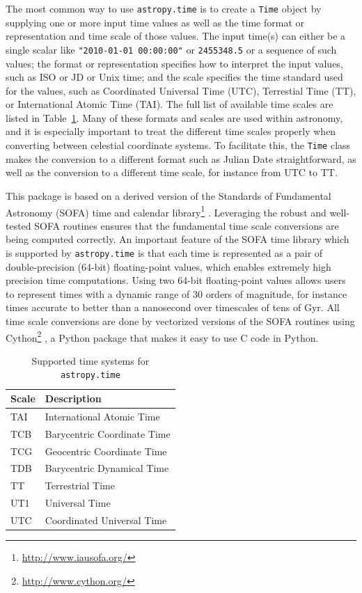 \documentclass[traditabstract]{aa}
\begin{document}
The most common way to use \texttt{astropy.time} is to create a \texttt{Time}
object by supplying one or more input time values as well as the time
format or representation and time scale of those values. The input time(s) can
either be a single scalar like \verb|"2010-01-01 00:00:00"| or \verb|2455348.5|
or a sequence of such values; the format or representation specifies how to
interpret the input values, such as ISO or JD or Unix time; and the scale
specifies the time standard used for the values, such as Coordinated Universal
Time (UTC), Terrestial Time (TT), or International Atomic Time (TAI). The full
list of available time scales are listed in Table~\ref{tab:time_systems}. Many
of these formats and scales are used within astronomy, and it is especially
important to treat the different time scales properly when converting between
celestial coordinate systems. To facilitate this, the \texttt{Time} class makes
the conversion to a different format such as Julian Date straightforward, as
well as the conversion to a different time scale, for instance from UTC to TT.

This package is based on a derived version of the Standards of Fundamental
Astronomy (SOFA) time and calendar
library\footnote{\url{http://www.iausofa.org/}} \citep{sofa_wallace}.
Leveraging the robust and well-tested SOFA routines ensures that the
fundamental time scale conversions are being computed correctly. An important
feature of the SOFA time library which is supported by \texttt{astropy.time} is
that each time is represented as a pair of double-precision (64-bit)
floating-point values, which enables extremely high precision time
computations. Using two 64-bit floating-point values allows users to represent
times with a dynamic range of 30 orders of magnitude, for instance times
accurate to better than a nanosecond over timescales of tens of Gyr. All time
scale conversions are done by vectorized versions of the SOFA routines using
Cython\footnote{\url{http://www.cython.org/}} \citep{cython}, a Python package
that makes it easy to use C code in Python.

\begin{table}
\caption{Supported time systems for \texttt{astropy.time}\label{tab:time_systems}}
\center
\begin{tabular}{ll}
\hline
Scale  & Description \\
\hline
TAI    & International Atomic Time \\
TCB    & Barycentric Coordinate Time \\
TCG    & Geocentric Coordinate Time \\
TDB    & Barycentric Dynamical Time \\
TT     & Terrestrial Time \\
UT1    & Universal Time \\
UTC    & Coordinated Universal Time \\
\hline
\end{tabular}
\end{table}
\end{document}
